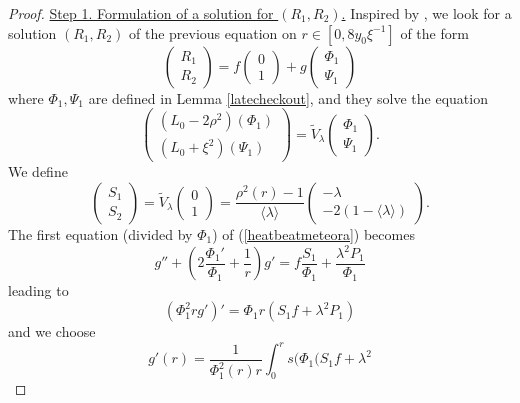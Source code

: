 \documentclass[11 pt]{amsart}
\theoremstyle{definition}
\theoremstyle{remark}
\numberwithin{equation}{section}
\begin{document}
\begin{proof}
\medskip
\noindent \underline{Step 1. Formulation of a solution for $(R_1, R_2)$.}
  Inspired by \cite{KriegerSchlag}, we look for a solution $(R_1, R_2)$ of the
  previous equation on $r \in [0, 8 y_0 \xi^{- 1}]$ of the form
  \[ \left(\begin{array}{c}
       R_1\\
       R_2
     \end{array}\right) = f \left(\begin{array}{c}
       0\\
       1
     \end{array}\right) + g \left(\begin{array}{c}
       \Phi_1\\
       \Psi_1
     \end{array}\right) \]
  where $\Phi_1, \Psi_1$ are defined in Lemma \ref{latecheckout}, and they
  solve the equation
  \[ \left(\begin{array}{c}
       (L_0 - 2 \rho^2) (\Phi_1)\\
       (L_0 + \xi^2) (\Psi_1)
     \end{array}\right) = \widetilde{V}_{\lambda} \left(\begin{array}{c}
       \Phi_1\\
       \Psi_1
     \end{array}\right) . \]
  We define
  \[ \left(\begin{array}{c}
       S_1\\
       S_2
     \end{array}\right) = \widetilde{V}_{\lambda} \left(\begin{array}{c}
       0\\
       1
     \end{array}\right) = \frac{\rho^2 (r) - 1}{\langle \lambda \rangle}
     \left(\begin{array}{c}
       - \lambda\\
       - 2 (1 - \langle \lambda \rangle)
     \end{array}\right) . \]
  The first equation (divided by $\Phi_1$) of (\ref{heatbeatmeteora}) becomes
  \begin{equation}
    g'' + \left( 2 \frac{\Phi_1'}{\Phi_1} + \frac{1}{r} \right) g' = f
    \frac{S_1}{\Phi_1} + \frac{\lambda^2 P_1}{\Phi_1} \label{beatback}
  \end{equation}
  leading to
  \[ (\Phi_1^2 r g')' = \Phi_1 r (S_1 f + \lambda^2 P_1) \]
  and we choose
  \begin{equation}
    g' (r) = \frac{1}{\Phi_1^2 (r) r} \int_0^r s (\Phi_1 (S_1 f + \lambda^2

\end{equation}
\end{proof}
\end{document}
